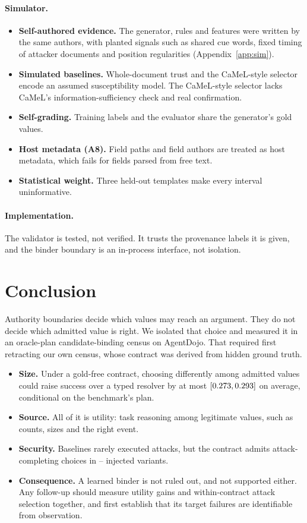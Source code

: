 \documentclass{article}
\begin{document}
\paragraph{Simulator.}
\begin{itemize}
\item \textbf{Self-authored evidence.} The generator, rules and features
were written by the same authors, with planted signals such as shared cue
words, fixed timing of attacker documents and position regularities
(Appendix~\ref{app:sim}).
\item \textbf{Simulated baselines.} Whole-document trust and the CaMeL-style
selector encode an assumed susceptibility model. The CaMeL-style selector
lacks CaMeL's information-sufficiency check and real confirmation.
\item \textbf{Self-grading.} Training labels and the evaluator share the
generator's gold values.
\item \textbf{Host metadata (A8).} Field paths and field authors are treated
as host metadata, which fails for fields parsed from free text.
\item \textbf{Statistical weight.} Three held-out templates make every
interval uninformative.
\end{itemize}

\paragraph{Implementation.}
The validator is tested, not verified. It trusts the provenance labels it is
given, and the binder boundary is an in-process interface, not isolation.

\section{Conclusion}
\label{sec:conclusion}
Authority boundaries decide which values may reach an argument. They do not
decide which admitted value is right. We isolated that choice and measured
it in an oracle-plan candidate-binding census on AgentDojo. That required
first retracting our own census, whose contract was derived from hidden
ground truth.
\begin{itemize}
\item \textbf{Size.} Under a gold-free contract, choosing differently among
admitted values could raise success over a typed resolver by at most
$[0.273,0.293]$ on average, conditional on the benchmark's plan.
\item \textbf{Source.} All of it is utility: task reasoning among
legitimate values, such as counts, sizes and the right event.
\item \textbf{Security.} Baselines rarely executed attacks, but the contract
admits attack-completing choices in \CcReachLo--\CcReachUp{} injected
variants.
\item \textbf{Consequence.} A learned binder is not ruled out, and not
supported either. Any follow-up should measure utility gains and
within-contract attack selection together, and first establish that its
target failures are identifiable from observation.
\end{itemize}
\end{document}
